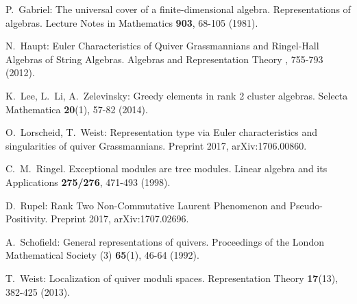 \documentclass[smallextended,envcountsect,envcountsame]{svjour3}
\numberwithin{equation}{section}
\begin{document}
\begin{thebibliography}{10}
  P.~Gabriel: The universal cover of a finite-dimensional algebra. Representations of algebras. Lecture Notes in Mathematics {\bf 903}, 68-105 (1981).
	
 N.~Haupt: Euler Characteristics of Quiver Grassmannians and Ringel-Hall Algebras of String Algebras. Algebras and Representation Theory , 755-793 (2012). 

  K.~Lee, L.~Li, A.~Zelevinsky: Greedy elements in rank 2 cluster algebras. Selecta Mathematica \textbf{20}(1), 57-82 (2014).

  O.~Lorscheid, T.~Weist: Representation type via Euler characteristics and singularities of quiver Grassmannians. Preprint 2017, arXiv:1706.00860.

  C.~M.~Ringel. Exceptional modules are tree modules. Linear algebra and its Applications \textbf{275/276}, 471-493 (1998).

  D.~Rupel: Rank Two Non-Commutative Laurent Phenomenon and Pseudo-Positivity. Preprint 2017, arXiv:1707.02696.

  A.~Schofield: General representations of quivers. Proceedings of the London Mathematical Society (3) \textbf{65}(1), 46-64 (1992).

  T.~Weist: Localization of quiver moduli spaces. Representation Theory \textbf{17}(13), 382-425 (2013).

\end{thebibliography}
\end{document}
